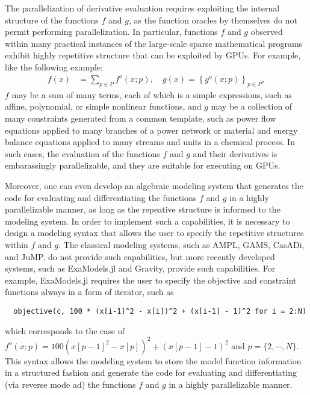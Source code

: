 \documentclass{article}
\begin{document}
The parallelization of derivative evaluation requires exploiting the internal structure of the functions $f$ and $g$, as the function oracles by themselves do not permit performing parallelization.
In particular, functions $f$ and $g$ observed within many practical instances of the large-scale sparse mathematical programs exhibit highly repetitive structure that can be exploited by GPUs. 
For example, like the following example:
\begin{align*}
  f(x) &= \sum_{p\in P} f^o(x; p), \quad g(x) = \left\{g^o(x; p)\right\}_{p\in P},
\end{align*}
$f$ may be a sum of many terms, each of which is a simple expressions, such as affine, polynomial, or simple nonlinear functions, and $g$ may be a collection of many constraints generated from a common template, such as power flow equations applied to many branches of a power network or material and energy balance equations applied to many streams and units in a chemical process. In such cases, the evaluation of the functions $f$ and $g$ and their derivatives is embarassingly parallelizable, and they are suitable for executing on GPUs.

Moreover, one can even develop an algebraic modeling system that generates the code for evaluating and differentiating the functions $f$ and $g$ in a highly parallelizable manner, as long as the repeative structure is informed to the modeling system. In order to implement such a capabilities, it is necessary to design a modeling syntax that allows the user to specify the repetitive structures within $f$ and $g$. The classical modeling systems, such as AMPL, GAMS, CasADi, and JuMP, do not provide such capabilities, but more recently developed systems, such as ExaModels.jl and Gravity, provide such capabilities. For example, ExaModels.jl requires the user to specify the objective and constraint functions always in a form of iterator, such as
\begin{lstlisting}
  objective(c, 100 * (x[i-1]^2 - x[i])^2 + (x[i-1] - 1)^2 for i = 2:N)
\end{lstlisting}
which corresponds to the case of $f^o(x; p) = 100(x[p-1]^2 - x[p])^2 + (x[p-1]-1)^2$ and $p=\{2,\cdots,N\}$.
This syntax allows the modeling system to store the model function information in a structured fashion and generate the code for evaluating and differentiating (via reverse mode \gls*{ad}) the functions $f$ and $g$ in a highly parallelizable manner. 
\end{document}
